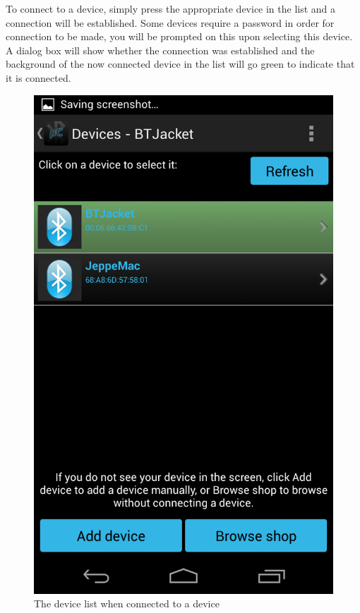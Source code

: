 		 To connect to a device, simply press the appropriate device in the list and a connection will be established. Some devices require a password in order for connection to be made, you will be prompted on this upon selecting this device. A dialog box will show whether the connection was established and the background of the now connected device in the list will go green to indicate that it is connected. \\
		\newline
		\newline
		\begin{figure}[H]
			\centering
			\includegraphics[scale = 0.3]{images/Screenshots/connected.png}
			\caption{The device list when connected to a device}
		\end{figure}

